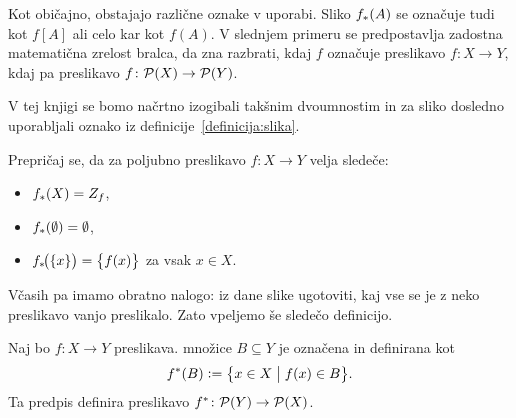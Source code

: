                 \begin{opomba}
                        Kot običajno, obstajajo različne oznake v uporabi. Sliko $\img{f}{A}$ se označuje tudi kot $f[A]$ ali celo kar kot $f(A)$. V slednjem primeru se predpostavlja zadostna matematična zrelost bralca, da zna razbrati, kdaj $f$ označuje preslikavo $f\colon X \to Y$, kdaj pa preslikavo $f\colon \mathcal{P}(X) \to \mathcal{P}(Y)$.

                        V tej knjigi se bomo načrtno izogibali takšnim dvoumnostim in za sliko dosledno uporabljali oznako iz definicije~\ref{definicija:slika}.
                \end{opomba}

                \begin{vaja}
                        Prepričaj se, da za poljubno preslikavo $f\colon X \to Y$ velja sledeče:
                        \begin{itemize}
                                \item
                                        $\img{f}{X} = \rn{f}$,
                                \item
                                        $\img{f}{\emptyset} = \emptyset$,
                                \item
                                        $\img[1]{f}{\set{x}} = \set[1]{f(x)}$ za vsak $x \in X$.
                        \end{itemize}
                \end{vaja}


                Včasih pa imamo obratno nalogo: iz dane slike ugotoviti, kaj vse se je z neko preslikavo vanjo preslikalo. Zato vpeljemo še sledečo definicijo.

                \begin{definicija}\label{definicija:praslika}
                        Naj bo $f\colon X \to Y$ preslikava.  množice $B \subseteq Y$ je označena in definirana kot
                        \[\pim{f}{B} \dfeq \set[1]{x \in X}{f(x) \in B}.\]
                        Ta predpis definira preslikavo $\pim{f}\colon \pst(Y) \to \pst(X)$.
                \end{definicija}

